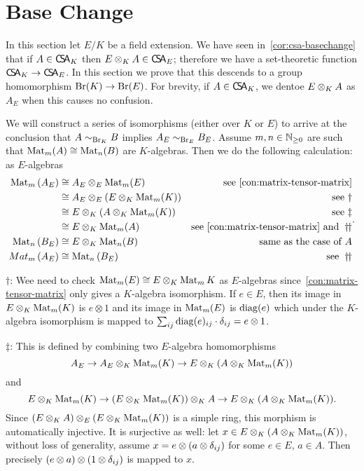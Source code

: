 \section{Base Change}
In this section let $E/K$ be a field extension. We have seen in~\cref{cor:csa-basechange} that if $A\in\operatorname{\mathsf{C}\!\mathsf{S}\!\mathsf{A}}_{K}$ then $E\otimes_{K}A\in\operatorname{\mathsf{C}\!\mathsf{S}\!\mathsf{A}}_{E}$; therefore we have a set-theoretic function $\operatorname{\mathsf{C}\!\mathsf{S}\!\mathsf{A}}_{K}\to\operatorname{\mathsf{C}\!\mathsf{S}\!\mathsf{A}}_{E}$. In this section we prove that this descends to a group homomorphism $\operatorname{Br}(K)\to\operatorname{Br}(E)$. For brevity, if $A\in \operatorname{\mathsf{C}\!\mathsf{S}\!\mathsf{A}}_{K}$, we dentoe $E\otimes_{K}A$ as $A_{E}$ when this causes no confusion.
\begin{construction}
  \label{con:br-base-change}
  We will construct a series of isomorphisms (either over $K$ or $E$) to arrive at the conclusion that $A\sim_{\operatorname{Br}_{K}}B$ implies $A_{E}\sim_{\operatorname{Br}_{E}}B_{E}$. Assume $m,n\in\mathbb{N}_{\ge0}$ are such that $\operatorname{Mat}_{m}(A)\cong\operatorname{Mat}_{n}(B)$ are $K$-algebras. Then we do the following calculation: as $E$-algebras
  \[
    \begin{aligned}
      \Mat_{m}\left(A_{E}\right)
      &\cong A_{E}\otimes_{E}\Mat_{m}(E) &\text{see~\cref{con:matrix-tensor-matrix}}\\
      &\cong A_{E}\otimes_{E}\left(E\ox_{K} \Mat_{m}(K)\right) & \text{see}~\dagger\\
      &\cong E \ox_{K}\left(A\ox_{K}\Mat_{m}(K)\right) &\text{see}~\ddagger\\
      &\cong E\ox_{K}\Mat_{m}(A) &\text{see~\cref{con:matrix-tensor-matrix} and}~\dagger\!\!\dagger \\
      \Mat_{n}\left(B_{E}\right) &\cong E\ox_{K}\Mat_{n}(B) &\text{same as the case of}~A\\
      Mat_{m}\left(A_{E}\right)&\cong \Mat_{n}\left(B_{E}\right) &\text{see}~\dagger\!\!\dagger
    \end{aligned}.
  \]

   \noindent$\dagger$: Wee need to check $\operatorname{Mat}_{m}(E)\cong E\otimes_{K}\operatorname{Mat}_{m}K$ as $E$-algebras since~\cref{con:matrix-tensor-matrix} only gives a $K$-algebra isomorphism. If $e \in E$, then its image in $E\otimes_{K}\operatorname{Mat}_{m}(K)$ is $e\otimes 1$ and its image in $\operatorname{Mat}_{m}(E)$ is $\operatorname{diag}(e)$ which under the $K$-algebra isomorphism is mapped to $\sum_{ij}\operatorname{diag}(e)_{ij}\cdot \delta_{ij}=e\otimes1$.

   \noindent$\ddagger$: This is defined by combining two $E$-algebra homomorphisms
   \[
     A_{E}\to A_{E}\otimes_{K}\operatorname{Mat}_{m}(K)\to E\otimes_{K}\left(A\otimes_{K}\operatorname{Mat}_{m}(K)\right)\]
     and
     \[
       E\otimes_{K}\operatorname{Mat}_{m}(K)\to \left(E\otimes_{K}\operatorname{Mat}_{m}(K)\right)\otimes_{K}A \to E\otimes_{K}(A\otimes_{K}\operatorname{Mat}_{m}(K)).
    \]
   Since $\left(E\otimes_{K}A\right)\otimes_{E}\left(E\otimes_{K}\operatorname{Mat}_{m}(K)\right)$ is a simple ring, this morphism is automatically injective. It is surjective as well: let $x\in E\otimes_{K}\left(A\otimes_{K}\operatorname{Mat}_{m}(K)\right)$, without loss of generality, assume $x=e\otimes (a\otimes\delta_{ij})$ for some $e\in E$, $a\in A$. Then precisely $\left(e\otimes a\right)\otimes\left(1\otimes\delta_{ij}\right)$ is mapped to $x$.


\end{construction}
